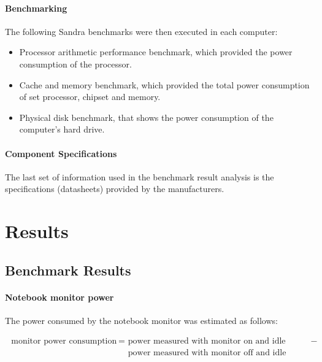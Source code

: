             
        \paragraph*{Benchmarking}
            The following Sandra benchmarks were then executed in each computer:
            \begin{itemize}
                \item Processor arithmetic performance benchmark, which provided the power consumption of the processor.
                \item Cache and memory benchmark, which provided the total power consumption of set processor, chipset and memory.
                \item Physical disk benchmark, that shows the power consumption of the computer's hard drive.
            \end{itemize}
            
            
        \paragraph*{Component Specifications}
            The last set of information used in the benchmark result analysis is the specifications (datasheets) provided by the  manufacturers. 
            
                        
            
\section{Results} \label{sec4:results}
    

    \subsection{Benchmark Results} \label{sec4:benchmark_results}

        \paragraph*{Notebook monitor power}
        
            The power consumed by the notebook monitor was estimated as follows: 
            
            \begin{equation}
                \begin{split}
                    \text{ monitor power consumption } =& \text{ power measured with monitor on and idle processor } -  \\
                    & \text{ power measured with monitor off and idle processor }  
                \end{split}
                \label{monitor_consumption}
            \end{equation}
            
